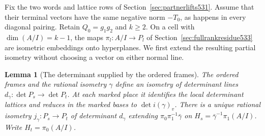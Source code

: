 \documentclass[a4paper,11pt]{article}
\newtheorem{lemma}[proposition]{Lemma}
\theoremstyle{definition}
\theoremstyle{remark}
\numberwithin{equation}{section}
\begin{document}
Fix the two words and lattice rows of Section~\ref{sec:partnerlifts531}.
Assume that their terminal vectors have the same negative norm
\(-T_0\), as happens in every diagonal pairing. Retain \(Q_0=g_1g_2\)
and \(k\ge2\). On a cell with \(\dim(A/I)=k-1\), the maps
\(\pi_l:A/I\to P_l\) of Section~\ref{sec:fullrankresidue533}
are isometric embeddings onto hyperplanes. We first extend the
resulting partial isometry without choosing a vector on either
normal line.

\begin{lemma}[The determinant supplied by the ordered frames]
\leavevmode\label{lem:flagdeterminant534}
The ordered frames and the rational isometry \(\gamma\) define
an isometry of determinant lines
\(d_\gamma:\det P_s\longrightarrow\det P_t\). At each marked
place it identifies the local determinant lattices and reduces
in the marked bases to \(\det i(\gamma)_v\).
There is a unique rational isometry \(j_\gamma:P_s\to P_t\) of
determinant \(d_\gamma\) extending
\(\pi_0\pi_1^{-1}\bar\gamma\) on
\(H_s=\bar\gamma^{-1}\pi_1(A/I)\). Write \(H_t=\pi_0(A/I)\).
\end{lemma}
\end{document}
